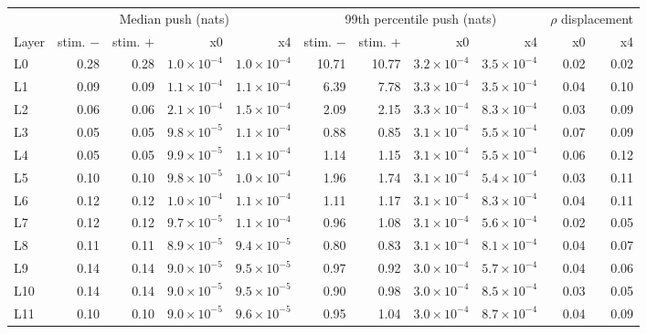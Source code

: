{\scriptsize\setlength{\tabcolsep}{4pt}\begin{longtable}{@{}lrrrrrrrrrr@{}}
\toprule & \multicolumn{4}{c}{Median push (nats)} & \multicolumn{4}{c}{99th percentile push (nats)} & \multicolumn{2}{c}{$\rho$ displacement} \\
Layer & stim. $-$ & stim. $+$ & x0 & x4 & stim. $-$ & stim. $+$ & x0 & x4 & x0 & x4 \\ \midrule \endhead
\bottomrule \endfoot
L0 & 0.28 & 0.28 & $1.0{\times}10^{-4}$ & $1.0{\times}10^{-4}$ & 10.71 & 10.77 & $3.2{\times}10^{-4}$ & $3.5{\times}10^{-4}$ & 0.02 & 0.02 \\
L1 & 0.09 & 0.09 & $1.1{\times}10^{-4}$ & $1.1{\times}10^{-4}$ & 6.39 & 7.78 & $3.3{\times}10^{-4}$ & $3.5{\times}10^{-4}$ & 0.04 & 0.10 \\
L2 & 0.06 & 0.06 & $2.1{\times}10^{-4}$ & $1.5{\times}10^{-4}$ & 2.09 & 2.15 & $3.3{\times}10^{-4}$ & $8.3{\times}10^{-4}$ & 0.03 & 0.09 \\
L3 & 0.05 & 0.05 & $9.8{\times}10^{-5}$ & $1.1{\times}10^{-4}$ & 0.88 & 0.85 & $3.1{\times}10^{-4}$ & $5.5{\times}10^{-4}$ & 0.07 & 0.09 \\
L4 & 0.05 & 0.05 & $9.9{\times}10^{-5}$ & $1.1{\times}10^{-4}$ & 1.14 & 1.15 & $3.1{\times}10^{-4}$ & $5.5{\times}10^{-4}$ & 0.06 & 0.12 \\
L5 & 0.10 & 0.10 & $9.8{\times}10^{-5}$ & $1.0{\times}10^{-4}$ & 1.96 & 1.74 & $3.1{\times}10^{-4}$ & $5.4{\times}10^{-4}$ & 0.03 & 0.11 \\
L6 & 0.12 & 0.12 & $1.0{\times}10^{-4}$ & $1.1{\times}10^{-4}$ & 1.11 & 1.17 & $3.1{\times}10^{-4}$ & $8.3{\times}10^{-4}$ & 0.04 & 0.11 \\
L7 & 0.12 & 0.12 & $9.7{\times}10^{-5}$ & $1.1{\times}10^{-4}$ & 0.96 & 1.08 & $3.1{\times}10^{-4}$ & $5.6{\times}10^{-4}$ & 0.02 & 0.05 \\
L8 & 0.11 & 0.11 & $8.9{\times}10^{-5}$ & $9.4{\times}10^{-5}$ & 0.80 & 0.83 & $3.1{\times}10^{-4}$ & $8.1{\times}10^{-4}$ & 0.04 & 0.07 \\
L9 & 0.14 & 0.14 & $9.0{\times}10^{-5}$ & $9.5{\times}10^{-5}$ & 0.97 & 0.92 & $3.0{\times}10^{-4}$ & $5.7{\times}10^{-4}$ & 0.04 & 0.06 \\
L10 & 0.14 & 0.14 & $9.0{\times}10^{-5}$ & $9.5{\times}10^{-5}$ & 0.90 & 0.98 & $3.0{\times}10^{-4}$ & $8.5{\times}10^{-4}$ & 0.03 & 0.05 \\
L11 & 0.10 & 0.10 & $9.0{\times}10^{-5}$ & $9.6{\times}10^{-5}$ & 0.95 & 1.04 & $3.0{\times}10^{-4}$ & $8.7{\times}10^{-4}$ & 0.04 & 0.09 \\

\end{longtable}}
